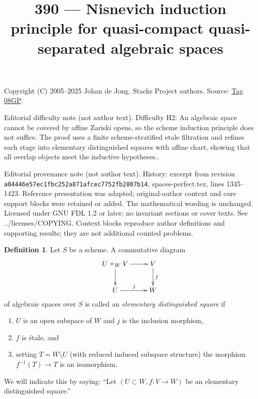 \documentclass{amsart}
\theoremstyle{plain}
\theoremstyle{definition}
\newtheorem{definition}[subsection]{Definition}
\theoremstyle{remark}
\numberwithin{equation}{subsection}
\begin{document}
\title[Stacks Project, Tag 08GP]{390 --- Nisnevich induction principle for quasi-compact quasi-separated algebraic spaces}
\maketitle
\noindent Copyright (C) 2005--2025 Johan de Jong. Stacks Project authors. Source: \href{https://stacks.math.columbia.edu/tag/08GP}{Tag 08GP}.

\noindent Editorial difficulty note (not author text). Difficulty H2: An algebraic space cannot be covered by affine Zariski opens, so the scheme induction principle does not suffice. The proof uses a finite scheme-stratified etale filtration and refines each stage into elementary distinguished squares with affine chart, showing that all overlap objects meet the inductive hypotheses..

\noindent Editorial provenance note (not author text). History: excerpt from revision \texttt{a0444\allowbreak 6e57e\allowbreak c1fbc\allowbreak 252a8\allowbreak 71afc\allowbreak ec775\allowbreak 2fb28\allowbreak 07b14}, spaces-perfect.tex, lines 1345--1423. Reference presentation was adapted; original-author context and core support blocks were retained or added. The mathematical wording is unchanged. Licensed under GNU FDL 1.2 or later; no invariant sections or cover texts. See ../licenses/COPYING. Context blocks reproduce author definitions and supporting results; they are not additional counted problems.

\begin{definition}
\label{definition-elementary-distinguished-square}
Let $S$ be a scheme. A commutative diagram
$$
\xymatrix{
U \times_W V \ar[r] \ar[d] & V \ar[d]^f \\
U \ar[r]^j & W
}
$$
of algebraic spaces over $S$ is called an {\it elementary distinguished square}
if
\begin{enumerate}
\item $U$ is an open subspace of $W$ and $j$ is the inclusion morphism,
\item $f$ is \'etale, and
\item setting $T = W \setminus U$ (with reduced induced
subspace structure) the morphism $f^{-1}(T) \to T$ is an isomorphism.
\end{enumerate}
We will indicate this by saying: ``Let $(U \subset W, f : V \to W)$
be an elementary distinguished square.''
\end{definition}
\end{document}
